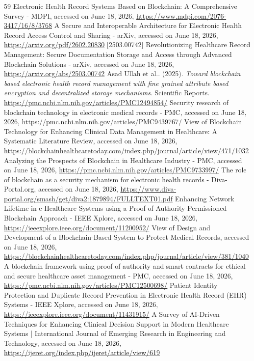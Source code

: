 \documentclass[12pt]{article}
\begin{document}
\begin{sloppypar}
\begin{thebibliography}{59}
 Electronic Health Record Systems Based on Blockchain: A Comprehensive Survey - MDPI, accessed on June 18, 2026, \url{https://www.mdpi.com/2076-3417/16/8/3768}
 A Secure and Interoperable Architecture for Electronic Health Record Access Control and Sharing - arXiv, accessed on June 18, 2026, \url{https://arxiv.org/pdf/2602.20830}
 [2503.00742] Revolutionizing Healthcare Record Management: Secure Documentation Storage and Access through Advanced Blockchain Solutions - arXiv, accessed on June 18, 2026, \url{https://arxiv.org/abs/2503.00742}
 Asad Ullah et al.. (2025). \textit{Toward blockchain based electronic health record management with fine grained attribute based encryption and decentralized storage mechanisms}. Scientific Reports. \url{https://pmc.ncbi.nlm.nih.gov/articles/PMC12494854/}
 Security research of blockchain technology in electronic medical records - PMC, accessed on June 18, 2026, \url{https://pmc.ncbi.nlm.nih.gov/articles/PMC9439767/}
 View of Blockchain Technology for Enhancing Clinical Data Management in Healthcare: A Systematic Literature Review, accessed on June 18, 2026, \url{https://blockchainhealthcaretoday.com/index.php/journal/article/view/471/1032}
 Analyzing the Prospects of Blockchain in Healthcare Industry - PMC, accessed on June 18, 2026, \url{https://pmc.ncbi.nlm.nih.gov/articles/PMC9733997/}
 The role of blockchain as a security mechanism for electronic health records - Diva-Portal.org, accessed on June 18, 2026, \url{https://www.diva-portal.org/smash/get/diva2:1879894/FULLTEXT01.pdf}
 Enhancing Network Lifetime in e-Healthcare Systems using a Proof-of-Authority Permissioned Blockchain Approach - IEEE Xplore, accessed on June 18, 2026, \url{https://ieeexplore.ieee.org/document/11200952/}
 View of Design and Development of a Blockchain-Based System to Protect Medical Records, accessed on June 18, 2026, \url{https://blockchainhealthcaretoday.com/index.php/journal/article/view/381/1040}
 A blockchain framework using proof of authority and smart contracts for ethical and secure healthcare asset management - PMC, accessed on June 18, 2026, \url{https://pmc.ncbi.nlm.nih.gov/articles/PMC12500698/}
 Patient Identity Protection and Duplicate Record Prevention in Electronic Health Record (EHR) Systems - IEEE Xplore, accessed on June 18, 2026, \url{https://ieeexplore.ieee.org/document/11431915/}
 A Survey of AI-Driven Techniques for Enhancing Clinical Decision Support in Modern Healthcare Systems | International Journal of Emerging Research in Engineering and Technology, accessed on June 18, 2026, \url{https://ijeret.org/index.php/ijeret/article/view/619}

\end{thebibliography}
\end{sloppypar}
\end{document}
